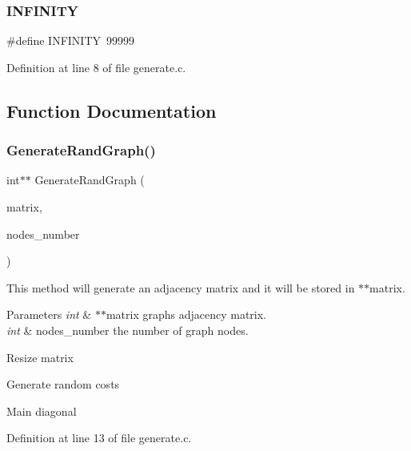 \subsubsection{I\+N\+F\+I\+N\+I\+TY}
{\footnotesize\ttfamily \#define I\+N\+F\+I\+N\+I\+TY~99999}



Definition at line 8 of file generate.\+c.



\subsection{Function Documentation}
\mbox{\label{generate_8c_a8d4ea219645520f49f17ec81bb16ef93}} 
\subsubsection{Generate\+Rand\+Graph()}
{\footnotesize\ttfamily int$\ast$$\ast$ Generate\+Rand\+Graph (\begin{DoxyParamCaption}\item[{int $\ast$$\ast$}]{matrix,  }\item[{int $\ast$}]{nodes\+\_\+number }\end{DoxyParamCaption})}

This method will generate an adjacency matrix and it will be stored in $\ast$$\ast$matrix. 
\begin{DoxyParams}{Parameters}
{\em int} & $\ast$$\ast$matrix graph\textquotesingle{}s adjacency matrix. \\
\hline
{\em int} & nodes\+\_\+number the number of graph nodes.\\
\hline
\end{DoxyParams}
Resize matrix

Generate random costs

Main diagonal 

Definition at line 13 of file generate.\+c.

